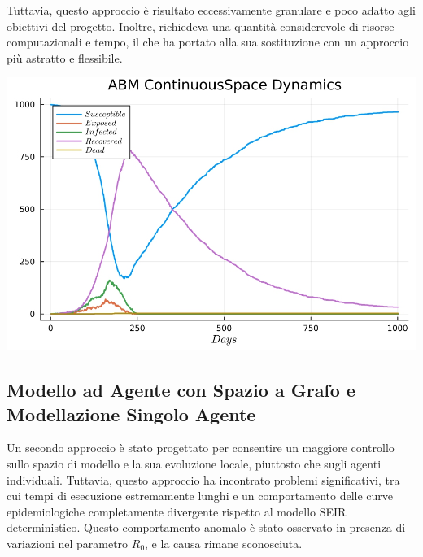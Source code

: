 Tuttavia, questo approccio è risultato eccessivamente granulare e 
poco adatto agli obiettivi del progetto. Inoltre, richiedeva una 
quantità considerevole di risorse computazionali e tempo, il che 
ha portato alla sua sostituzione con un approccio più astratto e flessibile.

\begin{minipage}{\linewidth}
    \centering
    \includegraphics[width=\textwidth]{img/plot_abm_continuousspace.jpg}
    \label{fig:seir_curve_continuous}
\end{minipage}

\newpage

\subsection{Modello ad Agente con Spazio a Grafo e Modellazione Singolo Agente}

Un secondo approccio è stato progettato per consentire un maggiore 
controllo sullo spazio di modello e la sua evoluzione locale, 
piuttosto che sugli agenti individuali. Tuttavia, questo approccio 
ha incontrato problemi significativi, tra cui tempi di esecuzione 
estremamente lunghi e un comportamento delle curve epidemiologiche 
completamente divergente rispetto al modello SEIR deterministico. 
Questo comportamento anomalo è stato osservato in presenza di variazioni 
nel parametro $R_0$, e la causa rimane sconosciuta.

